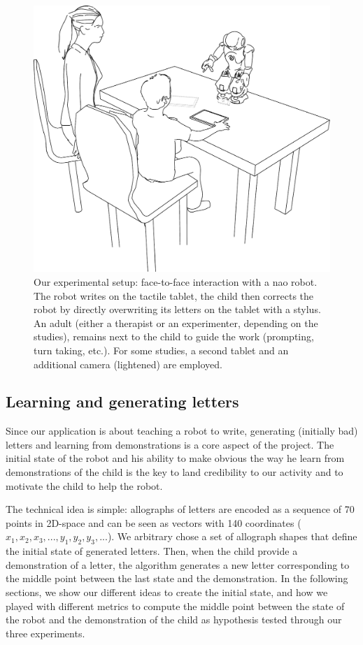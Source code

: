 \documentclass{sig-alternate}
\begin{document}
   \begin{figure}
       \centering
       \includegraphics[width=0.6\columnwidth]{experimental_setup}
       \caption{\small Our experimental setup: face-to-face interaction with a {\sc
           nao} robot.  The robot writes on the tactile tablet, the child then
           corrects the robot by directly overwriting its letters on the tablet
           with a stylus. An adult (either a therapist or an experimenter,
           depending on the studies), remains next to the child to guide the work
           (prompting, turn taking, etc.). For some studies, a second tablet and an
           additional camera (lightened) are employed.}

       \label{experimental_setup}
   \end{figure}

\subsection{Learning and generating letters}
Since our application is about teaching a robot to write, generating (initially
bad) letters and learning from demonstrations is a core aspect of the project.
The initial state of the robot and his ability to make obvious the way he learn
from demonstrations of the child is the key to land credibility to our
activity and to motivate the child to help the robot. 

The technical idea is simple: allographs of letters are encoded as a sequence of 70 points in
2D-space and can be seen as vectors with 140 coordinates
($x_1,x_2,x_3,...,y_1,y_2,y_3,...$). We arbitrary chose a set of allograph shapes
that define the initial state of generated letters. 
Then, when the child provide a demonstration of a letter, the algorithm
generates
a new letter corresponding to the middle point between the last state and the
demonstration. In the following sections, we show our different ideas to
create the initial state, and how we played with
different metrics to compute the middle point between the state of the robot and
the demonstration of the child as hypothesis tested through our three
experiments. 
\end{document}
